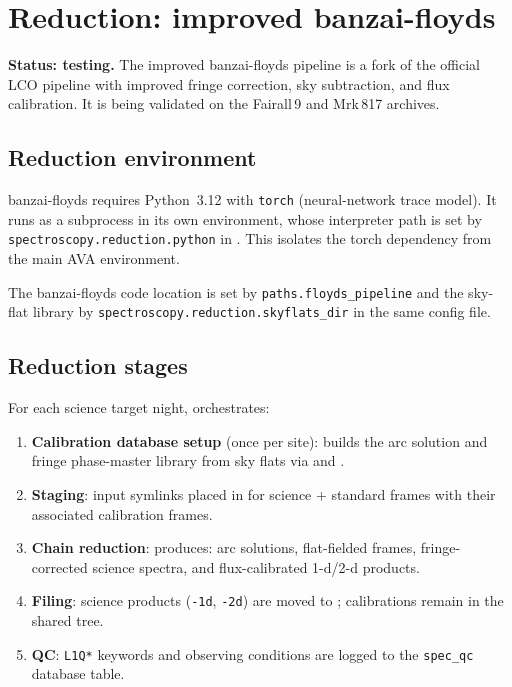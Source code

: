\documentclass[a4paper,12pt]{article}
\begin{document}
\section{Reduction: improved banzai-floyds}
\label{sec:reduction}

\begin{notebox}
\textbf{Status: testing.}  The improved banzai-floyds pipeline is a fork of the
official LCO pipeline with improved fringe correction, sky subtraction, and flux
calibration.  It is being validated on the Fairall\,9 and Mrk\,817 archives.
\end{notebox}

\subsection{Reduction environment}

banzai-floyds requires Python~3.12 with \texttt{torch} (neural-network trace
model).  It runs as a subprocess in its own environment, whose interpreter path
is set by \texttt{spectroscopy.reduction.python} in .
This isolates the torch dependency from the main AVA environment.

The banzai-floyds code location is set by \texttt{paths.floyds\_pipeline} and
the sky-flat library by \texttt{spectroscopy.reduction.skyflats\_dir} in the
same config file.

\subsection{Reduction stages}

For each science target night,  orchestrates:

\begin{enumerate}
  \item \textbf{Calibration database setup} (once per site): builds the arc
        solution and fringe phase-master library from sky flats via
         and .
  \item \textbf{Staging}: input symlinks placed in
         for science + standard frames with
        their associated calibration frames.
  \item \textbf{Chain reduction}:  produces:
        arc solutions, flat-fielded frames, fringe-corrected science spectra, and
        flux-calibrated 1-d/2-d products.
  \item \textbf{Filing}: science products (\texttt{-1d}, \texttt{-2d}) are moved
        to ;
        calibrations remain in the shared  tree.
  \item \textbf{QC}: \texttt{L1Q*} keywords and observing conditions are logged
        to the \texttt{spec\_qc} database table.
\end{enumerate}
\end{document}
